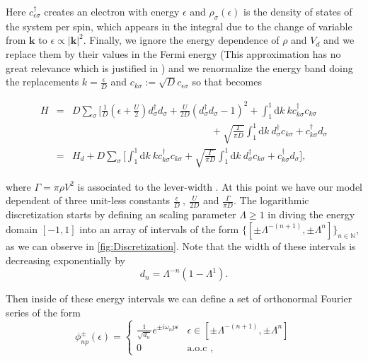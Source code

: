 Here $c_{\epsilon\sigma}^{\dagger}$ creates an electron with energy
$\epsilon$ and $\rho_{\sigma}(\epsilon)$ is the density of states
of the system per spin, which appears in the integral due to the change
of variable from $\mathbf{k}$ to $\epsilon\propto\left|\mathbf{k}\right|^{2}.$
Finally, we ignore the energy dependence of $\rho$ and $V_{d}$ and
we replace them by their values in the Fermi energy (This approximation
has no great relevance which is justified in \citep{krishna-murthy_renormalization-group_1980})
and we renormalize the energy band doing the replacements $k=\frac{\epsilon}{D}$
and $c_{k\sigma}:=\sqrt{D}c_{\epsilon\sigma}$ so that 
becomes

\begin{eqnarray}
H & = & D\sum_{\sigma}\Biggl[\frac{1}{D}\left(\epsilon+\frac{U}{2}\right)d_{\sigma}^{\dagger}d_{\sigma}+\frac{U}{2D}(d_{\sigma}^{\dagger}d_{\sigma}-1)^{2}+\int_{1}^{1}\mbox{d}k\ kc_{k\sigma}^{\dagger}c_{k\sigma}\nonumber \\
 &  & \qquad\qquad\qquad\qquad\qquad\qquad\qquad+\sqrt{\frac{\Gamma}{\pi D}}\int_{1}^{1}\mbox{d}k\ d_{\sigma}^{\dagger}c_{k\sigma}+c_{k\sigma}^{\dagger}d_{\sigma}\label{eq:Norm-HamEnergy}\\
 & = & H_{d}+D\sum_{\sigma}\Biggl[\int_{1}^{1}\mbox{d}k\ kc_{k\sigma}^{\dagger}c_{k\sigma}+\sqrt{\frac{\Gamma}{\pi D}}\int_{1}^{1}\mbox{d}k\ d_{\sigma}^{\dagger}c_{k\sigma}+c_{k\sigma}^{\dagger}d_{\sigma}\Biggr],
\end{eqnarray}


where $\Gamma=\pi\rho V^{2}$ is associated to the lever-width \citep[(3.5)]{sindel_numerical_2005}.
At this point we have our model dependent of three unit-less constants
$\frac{\epsilon}{D}\ ,\ \frac{U}{2D}$ and $\frac{\Gamma}{\pi D}$.
The logarithmic discretization starts by defining an scaling parameter
$\Lambda\geq1$ in diving the energy domain $[-1,1]$ into an array
of intervals of the form $\{[\pm\Lambda^{-(n+1)},\pm\Lambda^{n}]\}_{n\in\mathbb{N}}$,
as we can observe in \ref{fig:Discretization}. Note that the width
of these intervals is decreasing exponentially by 
\[
d_{n}=\Lambda^{-n}\left(1-\Lambda^{1}\right).
\]


Then inside of these energy intervals we can define a set of orthonormal
Fourier series of the form
\begin{equation}
\phi_{np}^{\pm}(\epsilon)=\begin{cases}
\frac{1}{\sqrt{d_{n}}}e^{\pm i\omega_{n}p\epsilon} & \epsilon\in[\pm\Lambda^{-(n+1)},\pm\Lambda^{n}]\\
0 & \mbox{a.o.c },
\end{cases}\label{eq:orthonormal-Fourier}
\end{equation}


